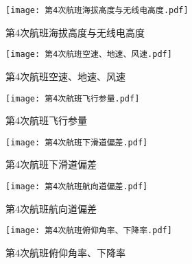 \documentclass{MathorCupModeling}
\begin{document}
	\begin{figure}[H]
		\centering
		\begin{minipage}{0.48\linewidth}
			\centering
			\texttt{[image: 第4次航班海拔高度与无线电高度.pdf]}
			\caption{第4次航班海拔高度与无线电高度}
			\label{fig:第4次航班海拔高度与无线电高度}
		\end{minipage}
		\begin{minipage}{0.48\linewidth}
			\centering
			\texttt{[image: 第4次航班空速、地速、风速.pdf]}
			\caption{第4次航班空速、地速、风速}
			\label{fig:第4次航班空速、地速、风速}
		\end{minipage}
	\end{figure}
	\begin{figure}[H]
		\centering
		\begin{minipage}{0.48\linewidth}
			\centering
			\texttt{[image: 第4次航班飞行参量.pdf]}
			\caption{第4次航班飞行参量}
			\label{fig:第4次航班飞行参量}
		\end{minipage}
		\begin{minipage}{0.48\linewidth}
			\centering
			\texttt{[image: 第4次航班下滑道偏差.pdf]}
			\caption{第4次航班下滑道偏差}
			\label{fig:第4次航班下滑道偏差}
		\end{minipage}
	\end{figure}
	\begin{figure}[H]
		\centering
		\begin{minipage}{0.48\linewidth}
			\centering
			\texttt{[image: 第4次航班航向道偏差.pdf]}
			\caption{第4次航班航向道偏差}
			\label{fig:第4次航班航向道偏差}
		\end{minipage}
		\begin{minipage}{0.48\linewidth}
			\centering
			\texttt{[image: 第4次航班俯仰角率、下降率.pdf]}
			\caption{第4次航班俯仰角率、下降率}
			\label{fig:第4次航班俯仰角率、下降率}
		\end{minipage}
	\end{figure}
\end{document}
